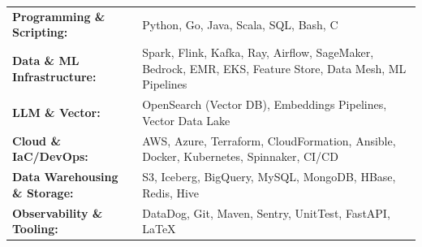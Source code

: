 \begin{flushleft}
\begin{tabular}{@{}l l@{}}
    \textbf{Programming \& Scripting:} & Python, Go, Java, Scala, SQL, Bash, C \\[0.1em]
    \textbf{Data \& ML Infrastructure:} & Spark, Flink, Kafka, Ray, Airflow, SageMaker, Bedrock, EMR, EKS, Feature Store, Data Mesh, ML Pipelines \\[0.1em]
    \textbf{LLM \& Vector:} & OpenSearch (Vector DB), Embeddings Pipelines, Vector Data Lake \\[0.1em]
    \textbf{Cloud \& IaC/DevOps:} & AWS, Azure, Terraform, CloudFormation, Ansible, Docker, Kubernetes, Spinnaker, CI/CD \\[0.1em]
    \textbf{Data Warehousing \& Storage:} & S3, Iceberg, BigQuery, MySQL, MongoDB, HBase, Redis, Hive \\[0.1em]
    \textbf{Observability \& Tooling:} & DataDog, Git, Maven, Sentry, UnitTest, FastAPI, \LaTeX
\end{tabular}
\end{flushleft}
